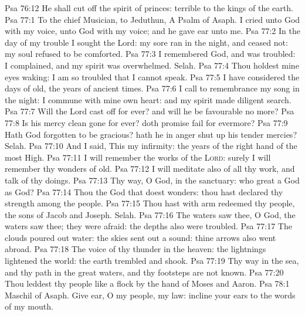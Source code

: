 \vs Psa 76:12 He shall cut off the spirit of princes:  terrible to the kings of the earth.
\vs Psa 77:1 To the chief Musician, to Jeduthun, A Psalm of Asaph. I cried unto God with my voice,  unto God with my voice; and he gave ear unto me.
\vs Psa 77:2 In the day of my trouble I sought the Lord: my sore ran in the night, and ceased not: my soul refused to be comforted.
\vs Psa 77:3 I remembered God, and was troubled: I complained, and my spirit was overwhelmed. Selah.
\vs Psa 77:4 Thou holdest mine eyes waking: I am so troubled that I cannot speak.
\vs Psa 77:5 I have considered the days of old, the years of ancient times.
\vs Psa 77:6 I call to remembrance my song in the night: I commune with mine own heart: and my spirit made diligent search.
\vs Psa 77:7 Will the Lord cast off for ever? and will he be favourable no more?
\vs Psa 77:8 Is his mercy clean gone for ever? doth  promise fail for evermore?
\vs Psa 77:9 Hath God forgotten to be gracious? hath he in anger shut up his tender mercies? Selah.
\vs Psa 77:10 And I said, This  my infirmity:  the years of the right hand of the most High.
\vs Psa 77:11 I will remember the works of the \textsc{Lord}: surely I will remember thy wonders of old.
\vs Psa 77:12 I will meditate also of all thy work, and talk of thy doings.
\vs Psa 77:13 Thy way, O God,  in the sanctuary: who  great a God as  God?
\vs Psa 77:14 Thou  the God that doest wonders: thou hast declared thy strength among the people.
\vs Psa 77:15 Thou hast with  arm redeemed thy people, the sons of Jacob and Joseph. Selah.
\vs Psa 77:16 The waters saw thee, O God, the waters saw thee; they were afraid: the depths also were troubled.
\vs Psa 77:17 The clouds poured out water: the skies sent out a sound: thine arrows also went abroad.
\vs Psa 77:18 The voice of thy thunder  in the heaven: the lightnings lightened the world: the earth trembled and shook.
\vs Psa 77:19 Thy way  in the sea, and thy path in the great waters, and thy footsteps are not known.
\vs Psa 77:20 Thou leddest thy people like a flock by the hand of Moses and Aaron.
\vs Psa 78:1 Maschil of Asaph. Give ear, O my people,  my law: incline your ears to the words of my mouth.
